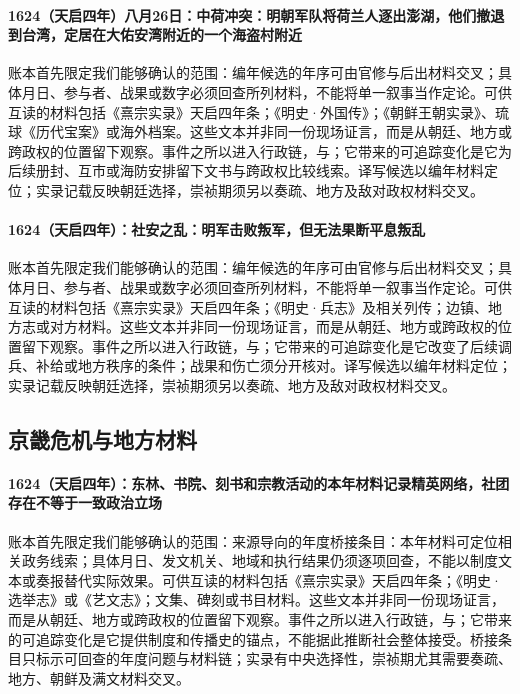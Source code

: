 \paragraph{1624（天启四年）八月26日：中荷冲突：明朝军队将荷兰人逐出澎湖，他们撤退到台湾，定居在大佑安湾附近的一个海盗村附近} 账本首先限定我们能够确认的范围：编年候选的年序可由官修与后出材料交叉；具体月日、参与者、战果或数字必须回查所列材料，不能将单一叙事当作定论。可供互读的材料包括《熹宗实录》天启四年条；《明史·外国传》；《朝鲜王朝实录》、琉球《历代宝案》或海外档案。这些文本并非同一份现场证言，而是从朝廷、地方或跨政权的位置留下观察。事件之所以进入行政链，与；它带来的可追踪变化是它为后续册封、互市或海防安排留下文书与跨政权比较线索。译写候选以编年材料定位；实录记载反映朝廷选择，崇祯期须另以奏疏、地方及敌对政权材料交叉。

\paragraph{1624（天启四年）：社安之乱：明军击败叛军，但无法果断平息叛乱} 账本首先限定我们能够确认的范围：编年候选的年序可由官修与后出材料交叉；具体月日、参与者、战果或数字必须回查所列材料，不能将单一叙事当作定论。可供互读的材料包括《熹宗实录》天启四年条；《明史·兵志》及相关列传；边镇、地方志或对方材料。这些文本并非同一份现场证言，而是从朝廷、地方或跨政权的位置留下观察。事件之所以进入行政链，与；它带来的可追踪变化是它改变了后续调兵、补给或地方秩序的条件；战果和伤亡须分开核对。译写候选以编年材料定位；实录记载反映朝廷选择，崇祯期须另以奏疏、地方及敌对政权材料交叉。

\subsection{京畿危机与地方材料}

\paragraph{1624（天启四年）：东林、书院、刻书和宗教活动的本年材料记录精英网络，社团存在不等于一致政治立场} 账本首先限定我们能够确认的范围：来源导向的年度桥接条目：本年材料可定位相关政务线索；具体月日、发文机关、地域和执行结果仍须逐项回查，不能以制度文本或奏报替代实际效果。可供互读的材料包括《熹宗实录》天启四年条；《明史·选举志》或《艺文志》；文集、碑刻或书目材料。这些文本并非同一份现场证言，而是从朝廷、地方或跨政权的位置留下观察。事件之所以进入行政链，与；它带来的可追踪变化是它提供制度和传播史的锚点，不能据此推断社会整体接受。桥接条目只标示可回查的年度问题与材料链；实录有中央选择性，崇祯期尤其需要奏疏、地方、朝鲜及满文材料交叉。

